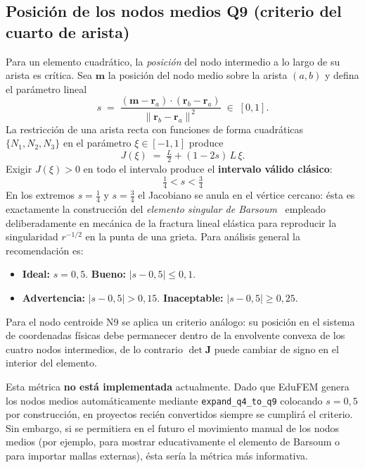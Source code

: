 \documentclass[11pt,a4paper]{article}
\begin{document}
\subsection{Posici\'on de los nodos medios Q9 (criterio del cuarto de arista)}
\label{sec:midside}

Para un elemento cuadr\'atico, la \emph{posici\'on} del nodo intermedio a lo largo de su arista es cr\'itica. Sea $\mathbf{m}$ la posici\'on del nodo medio sobre la arista $(a,b)$ y defina el par\'ametro lineal
\begin{equation}
s \;=\; \frac{(\mathbf{m}-\mathbf{r}_a)\cdot(\mathbf{r}_b-\mathbf{r}_a)}{\|\mathbf{r}_b-\mathbf{r}_a\|^{\,2}} \;\in\;[0,1].
\label{eq:s_param}
\end{equation}
La restricci\'on de una arista recta con funciones de forma cuadr\'aticas $\{N_1,N_2,N_3\}$ en el par\'ametro $\xi\in[-1,1]$ produce
\begin{equation}
J(\xi) \;=\; \tfrac{L}{2} + (1-2s)\,L\,\xi.
\label{eq:J_edge}
\end{equation}
Exigir $J(\xi)>0$ en todo el intervalo produce el \textbf{intervalo v\'alido cl\'asico}:
\begin{equation}
\boxed{\;\tfrac{1}{4} < s < \tfrac{3}{4}\;}
\label{eq:quarter_rule}
\end{equation}
En los extremos $s=\tfrac{1}{4}$ y $s=\tfrac{3}{4}$ el Jacobiano se anula en el v\'ertice cercano: \'esta es exactamente la construcci\'on del \emph{elemento singular de Barsoum}~\cite{Barsoum1976} empleado deliberadamente en mec\'anica de la fractura lineal el\'astica para reproducir la singularidad $r^{-1/2}$ en la punta de una grieta. Para an\'alisis general la recomendaci\'on es:
\begin{itemize}[leftmargin=1.2em]
  \item \textbf{Ideal:} $s = 0{,}5$. \textbf{Bueno:} $|s-0{,}5|\le 0{,}1$.
  \item \textbf{Advertencia:} $|s-0{,}5| > 0{,}15$. \textbf{Inaceptable:} $|s-0{,}5| \ge 0{,}25$.
\end{itemize}
Para el nodo centroide N9 se aplica un criterio an\'alogo: su posici\'on en el sistema de coordenadas f\'isicas debe permanecer dentro de la envolvente convexa de los cuatro nodos intermedios, de lo contrario $\det\mathbf{J}$ puede cambiar de signo en el interior del elemento.

\begin{recbox}[title={Relevancia para EduFEM}]
Esta m\'etrica \textbf{no est\'a implementada} actualmente. Dado que EduFEM genera los nodos medios autom\'aticamente mediante \texttt{expand\_q4\_to\_q9} colocando $s=0{,}5$ por construcci\'on, en proyectos reci\'en convertidos siempre se cumplir\'a el criterio. Sin embargo, si se permitiera en el futuro el movimiento manual de los nodos medios (por ejemplo, para mostrar educativamente el elemento de Barsoum o para importar mallas externas), \'esta ser\'ia la m\'etrica m\'as informativa.
\end{recbox}
\end{document}
